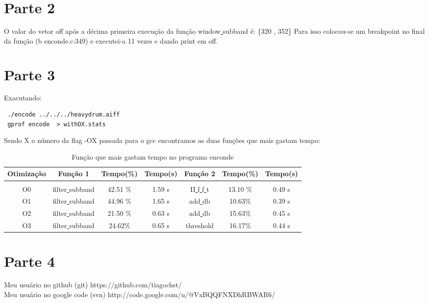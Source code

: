 \documentclass[10pt,a4paper]{article}
\begin{document}
\section{Parte 2}
O valor do vetor off após a décima primeira execução da função
window\underline{ }subband é: \{320 , 352\} 
Para isso colocou-se um breakpoint no final da função (b enconde.c:349) e executei-a 11 vezes e dando print em off.
\section{Parte 3}
Exacutando:
\begin{verbatim}
 ./encode ../../../heavydrum.aiff 
 gprof encode  > withOX.stats
\end{verbatim}
Sendo X o número da flag -OX passada para o gcc encontramos as duas
funções que mais gastam tempo:

\begin{table}[h!]
  \caption{Função que mais gastam tempo no programa enconde}
  \begin{tabular}{ccccccc}
    Otimização & Função 1 & Tempo(\%) & Tempo(s) & Função 2  & Tempo(\%) &
    Tempo(s)\\
    \hline\\
    O0 & filter\underline{ }subband &42.51 \% &1.59 s &
    II\underline{ }f\underline{ }f\underline{ }t& 13.10 \%& 0.49 s\\
    O1 & filter\underline{ }subband & 44.96 \%& 1.65 s &
    add\underline{ }db& 10.63\%& 0.39 s\\
    O2 &
    filter\underline{ }subband& 21.50 \%& 0.63 s &
    add\underline{ }db &15.63\% &0.45 s\\
    O3 &
    filter\underline{ }subband &24.62\%& 0.65 s&
    threshold & 16.17\%& 0.44 s


  \end{tabular}
\end{table}

\section{Parte 4}
Meu usuário no github (git) https://github.com/tiagochst/\\
Meu usuário no google code (svn) http://code.google.com/u/@VxBQQFNXDhRBWAR6/

% 
%   
\end{document}
